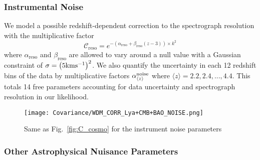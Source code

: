 \subsubsection{Instrumental Noise}

We model a possible redshift-dependent correction to the spectrograph resolution with the multiplicative factor 
\begin{equation}
\label{eq:Nuis1}
\mathcal{C}_{\mathrm{reso}} = e^{ - \left( \alpha_{\mathrm{reso}} + \beta_{\mathrm{reso}} (z-3) \right) \times k^2}
\end{equation} where $\alpha_{\mathrm{reso}}$ and $\beta_{\mathrm{reso}}$ are allowed to vary around a null value with a Gaussian constraint of $\sigma = \left( 5 \rm{km} s^{-1} \right)^2$. We also quantify the uncertainty in each 12 redshift bins of the data by multiplicative factors $\alpha^{\rm{noise}}_{\langle z \rangle}$ where $\langle z \rangle = 2.2, 2.4, ..., 4.4$. This totals 14 free parameters accounting for data uncertainty and spectrograph resolution in our likelihood.\\

\begin{figure}
\begin{center}
\texttt{[image: Covariance/WDM\_CORR\_Lya+CMB+BAO\_NOISE.png]}
\caption{Same as Fig.~\ref{fig:C_cosmo} for the instrument noise parameters}
\label{fig:C_reso}
\end{center}
\end{figure}


\subsubsection{Other Astrophysical Nuisance Parameters}

